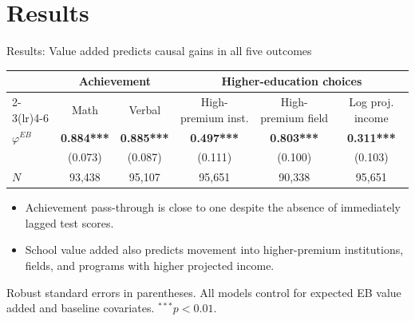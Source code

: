 \documentclass[11pt,aspectratio=169]{beamer}
\newenvironment{wideitemize}{%
  \begin{minipage}{0.92\textwidth}
  \begin{itemize}
  \addtolength{\itemsep}{0.75em}
}{%
  \end{itemize}
  \end{minipage}
}
\begin{document}
\section{Results}


\begin{frame}[label=results_one]{Results: Value added predicts causal gains in all five outcomes}
\centering
\scriptsize
\setlength{\tabcolsep}{6pt}
\begin{tabular}{lccccc}
\toprule
& \multicolumn{2}{c}{Achievement} & \multicolumn{3}{c}{Higher-education choices} \\
\cmidrule(lr){2-3}\cmidrule(lr){4-6}
& Math & Verbal & High-premium inst. & High-premium field & Log proj. income \\
\midrule
$\varphi^{EB}$
& \textbf{0.884***}
& \textbf{0.885***}
& \textbf{0.497***}
& \textbf{0.803***}
& \textbf{0.311***} \\
& (0.073) & (0.087) & (0.111) & (0.100) & (0.103) \\
$N$ & 93,438 & 95,107 & 95,651 & 90,338 & 95,651 \\
\bottomrule
\end{tabular}

\vspace{0.7em}
\begin{wideitemize}
  \item Achievement pass-through is close to one despite the absence of immediately lagged test scores.
  \item School value added also predicts movement into higher-premium institutions, fields, and programs with higher projected income.
\end{wideitemize}

\vspace{0.25em}
\hyperlink{heterogeneity_baseline}{}
\hspace{0.7em}
\hyperlink{heterogeneity_gender}{}

\vspace{0.35em}
\tiny Robust standard errors in parentheses. All models control for expected EB value added and baseline covariates. $^{***}p<0.01$.
\end{frame}
\end{document}
